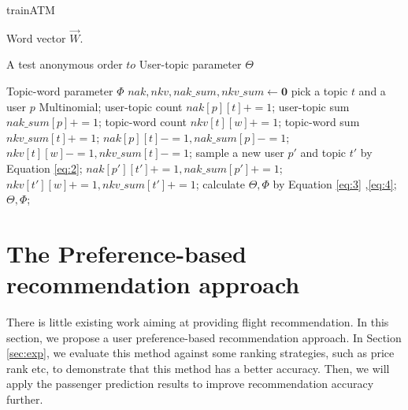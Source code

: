 \documentclass{llncs}
\begin{document}
\begin{algorithm}[htb]
\caption{trainATM}
\begin{algorithmic}[1]
\label{alg:2}
\REQUIRE
Word vector $\overrightarrow{W}$. \par
A test anonymous order $to$
\ENSURE 
User-topic parameter $\Theta$ \par
Topic-word parameter $\Phi$
\STATE $nak , nkv, nak\_sum, nkv\_sum \leftarrow \mathbf{0}$
\STATE pick a topic $t$ and a user $p$ Multinomial;
\STATE user-topic count $nak[p][t] += 1$;
\STATE user-topic sum $nak\_sum[p] += 1$;
\STATE topic-word count $nkv[t][w] += 1$;
\STATE topic-word sum $nkv\_sum[t] += 1$;
\ENDFOR
\ENDFOR
{}
\STATE $nak[p][t] -= 1, nak\_sum[p] -= 1$;
\STATE $nkv[t][w] -= 1, nkv\_sum[t] -= 1$;
\STATE sample a new user $p'$ and topic $t'$ by Equation \ref{eq:2};
\STATE $nak[p'][t'] += 1, nak\_sum[p'] += 1$;
\STATE $nkv[t'][w] += 1, nkv\_sum[t'] += 1$;
\ENDFOR
\ENDFOR
\ENDWHILE
\STATE calculate $\Theta,\Phi$ by Equation \ref{eq:3} ,\ref{eq:4};
\RETURN $\Theta,\Phi$;
\end{algorithmic} 
\end{algorithm}

\section{The Preference-based recommendation approach}
\label{sec:rec}
There is little existing work aiming at providing flight recommendation. In this section, we propose a user preference-based recommendation approach. In Section \ref{sec:exp}, we evaluate this method against some ranking strategies, such as price rank etc, to demonstrate that this method has a better accuracy. Then, we will apply the passenger prediction results to improve recommendation accuracy further.
\end{document}
